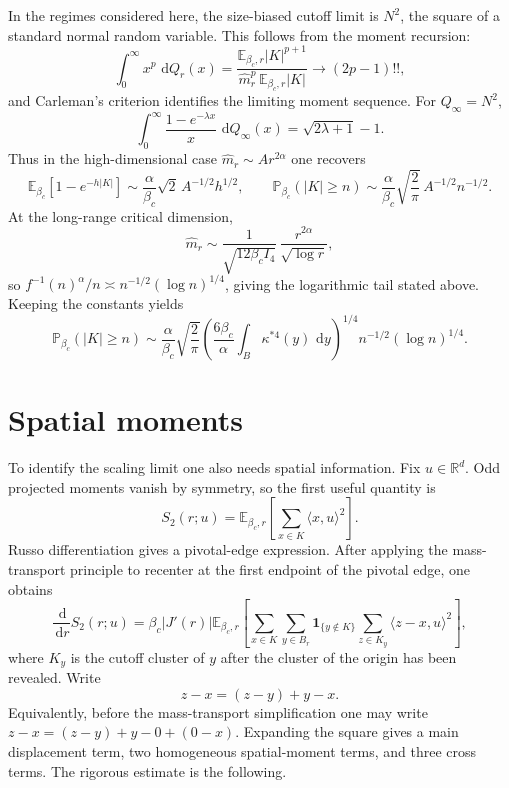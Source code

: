 \documentclass[11pt,reqno]{book}
\numberwithin{equation}{chapter}
\theoremstyle{plain}
\theoremstyle{definition}
\theoremstyle{remark}
\newcommand{\1}{\mathbf 1}
\newcommand{\dd}{\,\mathrm d}
\begin{document}
In the regimes considered here, the size-biased cutoff limit is \(N^2\), the
square of a standard normal random variable. This follows from the moment
recursion:
\[
  \int_0^\infty x^p\,\dd Q_r(x)
  =
  \frac{\mathbb E_{\beta_c,r}|K|^{p+1}}
       {\widehat m_r^p\,\mathbb E_{\beta_c,r}|K|}
  \longrightarrow (2p-1)!!,
\]
and Carleman's criterion identifies the limiting moment sequence. For
\(Q_\infty=N^2\),
\[
  \int_0^\infty\frac{1-e^{-\lambda x}}{x}\,\dd Q_\infty(x)
  =
  \sqrt{2\lambda+1}-1.
\]
Thus in the high-dimensional case \(\widehat m_r\sim Ar^{2\alpha}\) one
recovers
\[
  \mathbb E_{\beta_c}[1-e^{-h|K|}]\sim
  \frac{\alpha}{\beta_c}\sqrt{2}\,A^{-1/2}h^{1/2},
  \qquad
  \mathbb P_{\beta_c}(|K|\geq n)\sim
  \frac{\alpha}{\beta_c}\sqrt{\frac2\pi}\,A^{-1/2}n^{-1/2}.
\]
At the long-range critical dimension,
\[
  \widehat m_r
  \sim
  \frac{1}{\sqrt{12\beta_c I_4}}\,
  \frac{r^{2\alpha}}{\sqrt{\log r}},
\]
so \(f^{-1}(n)^\alpha/n\asymp n^{-1/2}(\log n)^{1/4}\), giving the
logarithmic tail stated above. Keeping the constants yields
\[
  \mathbb P_{\beta_c}(|K|\geq n)
  \sim
  \frac{\alpha}{\beta_c}\sqrt{\frac2\pi}
  \left(
    \frac{6\beta_c}{\alpha}
    \int_B\kappa^{*4}(y)\,\dd y
  \right)^{1/4}
  n^{-1/2}(\log n)^{1/4}.
\]

\section{Spatial moments}

To identify the scaling limit one also needs spatial information. Fix
\(u\in\mathbb R^d\). Odd projected moments vanish by symmetry, so the first
useful quantity is
\[
  S_2(r;u)=
  \mathbb E_{\beta_c,r}\left[
    \sum_{x\in K}\langle x,u\rangle^2
  \right].
\]
Russo differentiation gives a pivotal-edge expression. After applying the
mass-transport principle to recenter at the first endpoint of the pivotal
edge, one obtains
\[
  \frac{\dd}{\dd r}S_2(r;u)
  =
  \beta_c |J'(r)|
  \mathbb E_{\beta_c,r}\!\left[
    \sum_{x\in K}
    \sum_{y\in B_r}
    \1_{\{y\notin K\}}
    \sum_{z\in K_y}
    \langle z-x,u\rangle^2
  \right],
\]
where \(K_y\) is the cutoff cluster of \(y\) after the cluster of the origin
has been revealed. Write
\[
  z-x=(z-y)+y-x.
\]
Equivalently, before the mass-transport simplification one may write
\(z-x=(z-y)+y-0+(0-x)\). Expanding the square gives a main displacement term,
two homogeneous spatial-moment terms, and three cross terms. The rigorous
estimate is the following.
\end{document}
